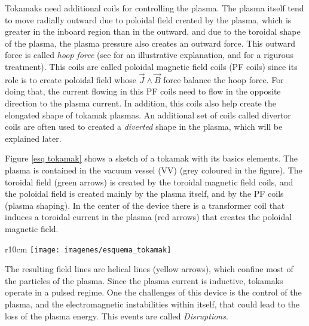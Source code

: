 \documentclass[a4paper,12pt,oneside]{book}
\begin{document}
Tokamaks need additional coils for controlling the plasma. The plasma itself tend to move radially outward due to poloidal field created by the plasma, which is greater in the inboard region than in the outward, and due to the toroidal shape of the plasma, the plasma pressure also creates an outward force. This outward force is called \textit{hoop force} (see \cite{Linjin} for an illustrative explanation, and \cite{Miyamoto} for a rigurous treatment). This coils are called poloidal magnetic field coils (PF coils) since its role is to create poloidal field whose $\vec{J} \wedge \vec{B}$ force balance the hoop force. For doing that, the current flowing in this PF coils need to flow in the opposite direction to the plasma current. In addition, this coils also help create the elongated shape of tokamak plasmas. An additional set of coils called divertor coils are often used to created a \textit{diverted} shape in the plasma, which will be explained later. 

Figure \ref{esq tokamak} shows a sketch of a tokamak with its basics elements. The plasma is contained in the vacuum vessel (VV) (grey coloured in the figure). The toroidal field (green arrows) is created by the toroidal magnetic field coils, and the poloidal field is created mainly by the plasma itself, and by the PF coils (plasma shaping). In the center of the device there is a transformer coil that induces a toroidal current in the plasma (red arrows) that creates the poloidal magnetic field. 
\begin{wrapfigure}{r}{10cm}
\centering
\texttt{[image: imagenes/esquema\_tokamak]}
\caption{Sketch of a tokamak, showing its basic elements, the field lines and the plasma current. Source: google images, 2019.}
\label{esq tokamak}
\end{wrapfigure} 
%
The resulting field lines are helical lines (yellow arrows), which confine most of the particles of the plasma. Since the plasma current is inductive, tokamaks operate in a pulsed regime. One the challenges of this device is the control of the plasma, and the electromagnetic instabilities within itself, that could lead to the loss of the plasma energy. This events are called \textit{Disruptions}.
\end{document}
